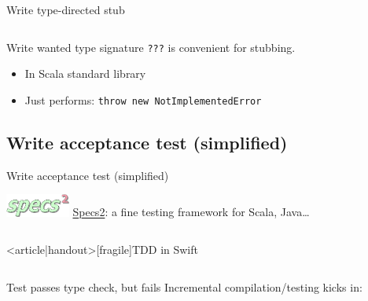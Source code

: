 \begin{frame}[fragile]{Write type-directed stub}
  \inputminted{scala}{Main2.scala}

  \begin{block}{Write wanted type signature}
    \texttt{???} is convenient for stubbing.
    \begin{itemize}
    \item In Scala standard library
    \item Just performs: \texttt{throw new NotImplementedError}
    \end{itemize}
  \end{block}
\end{frame}

\subsection{Write acceptance test (simplified)}

\begin{frame}[fragile]{Write acceptance test (simplified)}
  \begin{block}{\includegraphics[height=0.75cm]{specs2.png}}
    \href{http://specs2.org/}{Specs2}: a fine testing framework for Scala, Java\dots
  \end{block}

  \inputminted{scala}{MainSpec1.scala}

\end{frame}

\begin{frame}<article|handout>[fragile]{TDD in Swift}
  \inputminted{swift}{MainSpec1.swift}
\end{frame}

\begin{frame}[fragile]{Test passes type check, but fails}
  Incremental compilation/testing kicks in:

  \inputminted{console}{testQuick2.console}
\end{frame}

